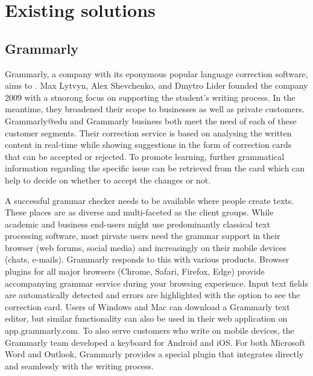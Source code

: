 \documentclass[runningheads]{llncs}
\let\OldTextregistered\textregistered
\renewcommand{\textregistered}{\OldTextregistered\xspace}
\begin{document}

\section{Existing solutions}
\subsection{Grammarly\textregistered}
Grammarly\textregistered, a company with its eponymous popular language correction software, aims to . Max Lytvyn, Alex Shevchenko, and Dmytro Lider founded the company 2009 with a stnorong focus on supporting the student's writing process. In the meantime, they broadened their scope to businesses as well as private customers. Grammarly\textregistered @edu and Grammarly\textregistered business both meet the need of each of these customer segments. Their correction service is based on analysing the written content in real-time while showing suggestions in the form of correction cards that can be accepted or rejected. To promote learning, further grammatical information regarding the specific issue can be retrieved from the card which can help to decide on whether to accept the changes or not. \citep{noauthor_grammarly_nodate}

A successful grammar checker needs to be available where people create texts. These places are as diverse and multi-faceted as the client groups. While academic and business end-users might use predominantly classical text processing software, most pirvate users need the grammar support in their browser (web forums, social media) and increasingly on their mobile devices (chats, e-mails). Grammarly\textregistered responds to this with various products. Browser plugins for all major browsers (Chrome, Safari, Firefox, Edge) provide accompanying grammar service during your browsing experience. Input text fields are automatically detected and errors are highlighted with the option to see the correction card. Users of Windows and Mac can download a Grammarly\textregistered text editor, but similar functionality can also be used in their web application on app.grammarly.com. To also serve customers who write on mobile devices, the Grammarly\textregistered team developed a keyboard for Android and iOS. For both Microsoft Word and Outlook, Grammarly\textregistered provides a special plugin that integrates directly and seamlessly with the writing process.
\end{document}
